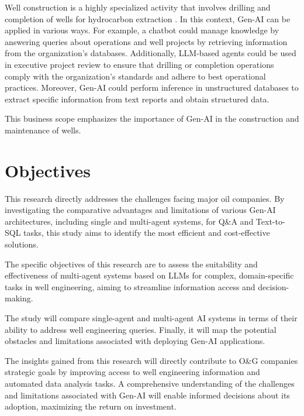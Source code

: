     Well construction is a highly specialized activity that involves drilling and completion of wells for hydrocarbon extraction \citep{Thomas2004}. In this context, Gen-AI can be applied in various ways. 
    For example, a chatbot could manage knowledge by answering queries about operations and well projects by retrieving information from the organization's databases. 
    Additionally, LLM-based agents could be used in executive project review to ensure that drilling or completion operations comply with the organization's standards and adhere to best operational practices. 
    Moreover, Gen-AI could perform inference in unstructured databases to extract specific information from text reports and obtain structured data. 
    
    This business scope emphasizes the importance of Gen-AI in the construction and maintenance of wells.



\section{Objectives}

    This research directly addresses the challenges facing major oil companies. 
    By investigating the comparative advantages and limitations of various Gen-AI architectures, including single and multi-agent systems, for Q\&A and Text-to-SQL tasks, this study aims to identify the most efficient and cost-effective solutions.
    
    The specific objectives of this research are to assess the suitability and effectiveness of multi-agent systems based on LLMs for complex, domain-specific tasks in well engineering, aiming to streamline information access and decision-making.
    
    The study will compare single-agent and multi-agent AI systems in terms of their ability to address well engineering queries. Finally, it will map the potential obstacles and limitations associated with deploying Gen-AI applications.
            
    The insights gained from this research will directly contribute to O\&G companies strategic goals by improving access to well engineering information and automated data analysis tasks. 
    A comprehensive understanding of the challenges and limitations associated with Gen-AI will enable informed decisions about its adoption, maximizing the return on investment. 

